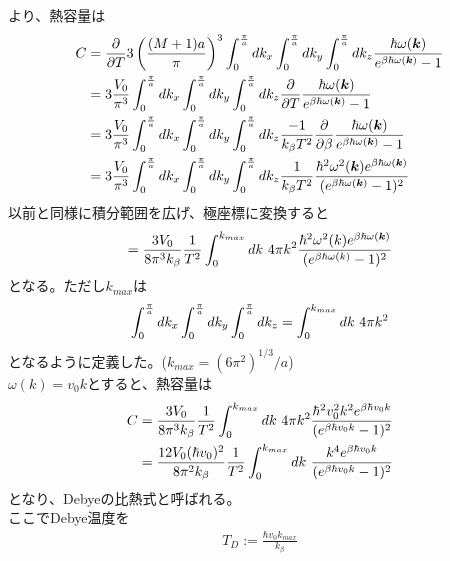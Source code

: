 \documentclass{jsarticle}  %
\numberwithin{equation}{section} %
\numberwithin{figure}{section}
\begin{document}
    より、熱容量は
    \begin{align}
        C &= \frac{\partial}{\partial T} 3\left( \frac{(M+1)a}{\pi} \right)^3 \int_0^{\frac{\pi}{a}} dk_x \int_0^{\frac{\pi}{a}} dk_y \int_0^{\frac{\pi}{a}} dk_z \frac{\hbar \omega (\bm{k})}{ e^{\beta \hbar \omega (\bm{k})} - 1} \notag \\
        &= 3\frac{V_0}{\pi^3} \int_0^{\frac{\pi}{a}} dk_x \int_0^{\frac{\pi}{a}} dk_y \int_0^{\frac{\pi}{a}} dk_z  \frac{\partial}{\partial T} \frac{\hbar \omega (\bm{k})}{ e^{\beta \hbar \omega (\bm{k})} - 1} \notag \\
        &= 3\frac{V_0}{\pi^3} \int_0^{\frac{\pi}{a}} dk_x \int_0^{\frac{\pi}{a}} dk_y \int_0^{\frac{\pi}{a}} dk_z \frac{-1}{k_\beta T^2} \frac{\partial}{\partial \beta} \frac{\hbar \omega (\bm{k})}{ e^{\beta \hbar \omega (\bm{k})} - 1} \notag \\
        &= 3\frac{V_0}{\pi^3} \int_0^{\frac{\pi}{a}} dk_x \int_0^{\frac{\pi}{a}} dk_y \int_0^{\frac{\pi}{a}} dk_z \frac{1}{k_\beta T^2} \frac{\hbar^2 \omega^2 (\bm{k}) e^{\beta \hbar \omega (\bm{k})}}{ (e^{\beta \hbar \omega (\bm{k})} - 1)^2} \notag 
    \end{align}
    以前と同様に積分範囲を広げ、極座標に変換すると
    \begin{align}
        = \frac{3V_0}{8\pi^3 k_\beta} \frac{1}{T^2} \int_0^{k_{max}} dk\ 4\pi k^2 \frac{\hbar^2 \omega^2 (k)e^{\beta \hbar \omega (\bm{k})}}{ (e^{\beta \hbar \omega (k)} - 1)^2} \notag 
    \end{align}
    となる。ただし$k_{max}$は
    \begin{align}
         \int_0^{\frac{\pi}{a}} dk_x \int_0^{\frac{\pi}{a}} dk_y \int_0^{\frac{\pi}{a}} dk_z = \int_0^{k_{max}} dk\ 4\pi k^2 \notag 
    \end{align}
    となるように定義した。($k_{max} = (6\pi^2)^{1/3} / a$)\\
    $\omega (k) = v_0 k$とすると、熱容量は
    \begin{align}
        C &= \frac{3V_0}{8\pi^3 k_\beta} \frac{1}{T^2} \int_0^{k_{max}} dk\ 4\pi k^2 \frac{\hbar^2 v_0^2 k^2 e^{\beta \hbar v_0 k}}{ (e^{\beta \hbar v_0 k} - 1)^2} \notag \\
        &= \frac{12V_0(\hbar v_0 )^2}{8\pi^2 k_\beta} \frac{1}{T^2} \int_0^{k_{max}} dk\ \frac{k^4 e^{\beta \hbar v_0 k}}{(e^{\beta \hbar v_0 k} - 1)^2} 
    \end{align}
    となり、Debyeの比熱式と呼ばれる。\\
    ここでDebye温度を
    \begin{align}
        T_D := \frac{\hbar v_0 k_{max}}{k_\beta}
    \end{align}
\end{document}
